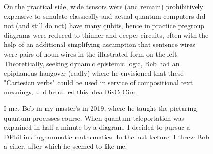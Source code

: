 \begin{figure}[h!]
\centering
{}
\caption{On the practical side, wide tensors were (and remain) prohibitively expensive to simulate classically and actual quantum computers did not (and still do not) have many qubits, hence in practice pregroup diagrams were reduced to thinner and deeper circuits, often with the help of an additional simplifying assumption that sentence wires were pairs of noun wires in the illustrated form on the left. Theoretically, seeking dynamic epistemic logic, Bob had an epiphanous hangover (really) where he envisioned that these "Cartesian verbs" could be used in service of compositional text meanings, and he called this idea DisCoCirc \citep{coeckeMathematicsTextStructure2020a}.}
\end{figure}

\clearpage

\begin{figure}[h!]
\centering
{}
\caption{I met Bob in my master's in 2019, where he taught the picturing quantum processes course. When quantum teleportation was explained in half a minute by a diagram, I decided to pursue a DPhil in diagrammatic mathematics. In the last lecture, I threw Bob a cider, after which he seemed to like me.}
\end{figure}

